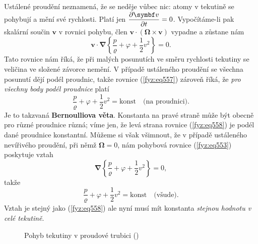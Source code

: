     Ustálené proudění neznamená, že se neděje vůbec nic: atomy v tekutině se pohybují a mění
    své rychlosti. Platí jen \(\pder{\bm{v}}{t} = 0\). Vypočítáme-li pak skalární součin \(\bm{v}\) 
    v rovnici pohybu, člen \(\bm{v}\cdot(\symbf{\Omega}\times\bm{v})\)  vypadne a zůstane nám
    \begin{equation}\label{fyz:eq557}
      \bm{v}\cdot\symbf{\nabla}\left\lbrace\dfrac{p}{\varrho}
      + \varphi + \dfrac{1}{2}v^2\right\rbrace = 0.
    \end{equation}
    Tato rovnice nám říká, že při malých posunutích ve směru rychlosti tekutiny se veličina ve 
    složené závorce nemění. V případě ustáleného proudění se všechna posunutí dějí podél proudnic, 
    takže rovnice (\ref{fyz:eq557}) zároveň říká, že \emph{pro všechny body podél proudnice} platí
    \begin{equation}\label{fyz:eq558}
      \dfrac{p}{\varrho}+\varphi+\dfrac{1}{2}v^2 = \text{konst} \quad \text{(na proudnici)}.
    \end{equation}
    Je to takzvaná \textbf{Bernoulliova věta}. Konstanta na pravé straně může být obecně pro různé 
    proudnice různá; víme jen, že levá strana rovnice (\ref{fyz:eq558}) je podél dané proudnice 
    konstantní. Můžeme si však všimnout, že v případě ustáleného nevířivého proudění, při němž 
    \(\symbf{\Omega} =0\), nám pohybová rovnice (\ref{fyz:eq553}) poskytuje vztah
    \begin{equation}\label{fyz:eq559}
      \symbf{\nabla}\left\lbrace\dfrac{p}{\varrho}+\varphi+\dfrac{1}{2}v^2\right\rbrace = 0,
    \end{equation}
    takže
    \begin{equation}\label{fyz:eq560}
      \dfrac{p}{\varrho}+\varphi+\dfrac{1}{2}v^2 = \text{konst} \quad \text{(všude)}.
    \end{equation}
    Vztah je stejný jako (\ref{fyz:eq558}) ale nyní musí mít konstanta \emph{stejnou hodnotu v celé 
    tekutině}.

    \begin{figure}[ht!]
      \centering
                     \newline
      \caption{Pohyb tekutiny v proudové trubici
               (\cite[s.~748]{Feynman02})}
      \label{fyz:fig549}
    \end{figure}
    

